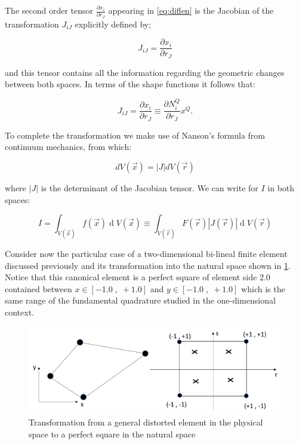 The second order tensor $\frac{\partial x_i}{\partial r_J}$ appearing in \ref{eq:diflen} is the Jacobian of the transformation $J_{iJ}$ explicitly defined by;


\[J_{iJ}=\frac{\partial x_i}{\partial r_J}\]

and this tensor contains all the information regarding the geometric changes between both spaces. In terms of the shape functions it follows that:

\begin{equation}
J_{iJ}=\frac{\partial x_i}{\partial r_J}\equiv\frac{\partial N_i^Q}{\partial r_J}x^Q.
\label{eq:disJac}
\end{equation}

To complete the transformation we make use of Nanson's formula from continuum mechanics, from which:


\[ dV(\overrightarrow x)=\left|J\right|dV(\overrightarrow r)\]


where $\left|J\right|$ is the determinant of the Jacobian tensor. We can write for $I$ in both spaces:


\begin{equation}
I=\int_{V(\overrightarrow x)}f(\overrightarrow x)\operatorname dV(\overrightarrow x)\equiv\int_{V(\overrightarrow r)}F(\overrightarrow r)\left|J(\overrightarrow r)\right|\operatorname dV(\overrightarrow r)
\label{eq:twoInte}
\end{equation}


Consider now the particular case of a two-dimensional bi-lineal finite element discussed previously and its transformation into the natural space shown in \cref{fig:IsoMap}. Notice that this canonical element is a perfect square of element side $2.0$ contained between $x\in\left[-1.0\;,\;+1.0\right]$ and $y\in\left[-1.0\;,\;+1.0\right]$ which is the same range of the fundamental quadrature studied in the one-dimensional context.


\begin{figure}[H]
\centering
\includegraphics[width=12cm]{img/mapping2}
\caption{Transformation from a general distorted element in the physical space to a perfect square in the natural space}
\label{fig:IsoMap}
\end{figure}



